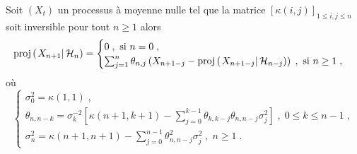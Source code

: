 \begin{proposition}
Soit $(X_t)$ un processus \`a moyenne nulle tel que la matrice
$[\kappa(i,j)]_{1\leq i,j\leq n}$ soit inversible pour tout $n\geq 1$
alors
$$
\proj{X_{n+1}}{\cH_n}=
\begin{cases}
0\;, \textrm{ si } n=0\;,\\
 \sum_{j=1}^n \theta_{n,j} \left( X_{n+1-j} -
   \proj{X_{n+1-j}}{\cH_{n-j}}\right)\;, \textrm{ si } n\geq 1\;,
\end{cases}
$$
o\`u
$$
\begin{cases}
\sigma_0^2=\kappa(1,1)\;,\\
\theta_{n,n-k}= \sigma_{k}^{-2} \left[ \kappa(n+1,k+1) -
  \sum_{j=0}^{k-1} \theta_{k,k-j} \theta_{n,n-j} \sigma_{j}^2
\right]\;,\; 0\leq k\leq n-1\;,\\
\sigma_{n}^2= \kappa(n+1,n+1) - \sum_{j=0}^{n-1} \theta^2_{n,n-j}
\sigma_{j}^2\;,\; n\geq 1 \;.
\end{cases}
$$
\end{proposition}


